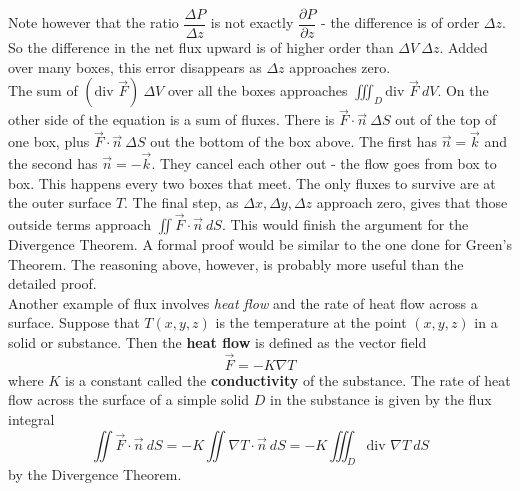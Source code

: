 Note however that the ratio $\dfrac{\Delta P}{\Delta z}$ is not exactly $\dfrac{\partial P}{\partial z}$ - the difference is of order $\Delta z$.  So the difference in the net flux upward is of higher order than $\Delta V \: \Delta z$.  Added over many boxes, this error disappears as $\Delta z$ approaches zero.\\

The sum of $\left( \text{div } \vec F \right) \: \Delta V$ over all the boxes approaches $\iiint_D \text{div } \vec F \: dV$.  On the other side of the equation is a sum of fluxes.  There is $\vec F \cdot \vec n \: \Delta S$ out of the top of one box, plus $\vec F \cdot \vec n \: \Delta S$ out the bottom of the box above.  The first has $\vec n = \vec k$ and the second has $\vec n = -\vec k$.  They cancel each other out - the flow goes from box to box.  This happens every two boxes that meet.  The only fluxes to survive are at the outer surface $T$.  The final step, as $\Delta x, \Delta y, \Delta z$ approach zero, gives that those outside terms approach $\iint \vec F \cdot \vec n \: dS$. This would finish the argument for the Divergence Theorem.  A formal proof would be similar to the one done for Green's Theorem.  The reasoning above, however, is probably more useful than the detailed proof.\\

Another example of flux involves \emph{heat flow} and the rate of heat flow across a surface.  Suppose that $T(x,y,z)$ is the temperature at the point $(x,y,z)$ in a solid or substance. Then the \textbf{heat flow} is defined as the vector field
$$\vec F = -K \nabla T$$
where $K$ is a constant called the \textbf{conductivity} of the substance. The rate of heat flow across the surface of a simple solid $D$ in the substance is given by the flux integral
$$\iint \vec F \cdot \vec n \: dS = -K \iint \nabla T \cdot \vec n \: dS = -K \iiint_D \text{div } \nabla T \: dS$$
by the Divergence Theorem.\\

\\


